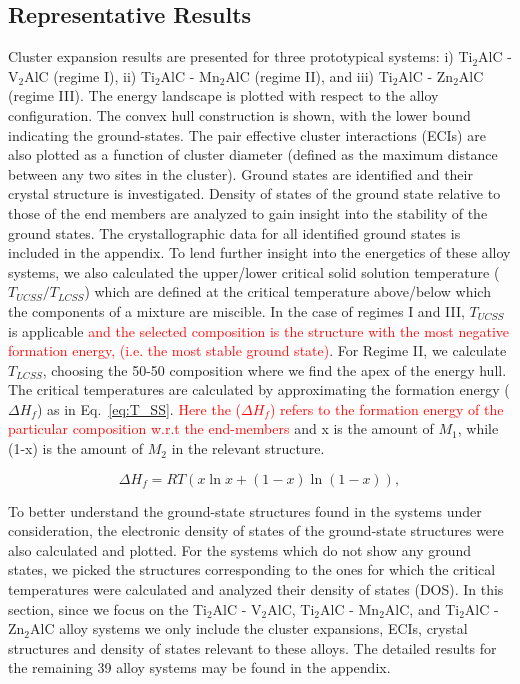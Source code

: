\documentclass[preprint,amsmath,amssymb,aps, prb,showkeys]{revtex4-1}
\newcommand{\eq}[1]{Eq.~\ref{#1}}
\begin{document}
\subsection{Representative Results}
 Cluster expansion results are presented for three prototypical systems: i) Ti$_2$AlC - V$_2$AlC  (regime I), ii) Ti$_2$AlC - Mn$_2$AlC  (regime II), and iii) Ti$_2$AlC - Zn$_2$AlC  (regime III). The energy landscape is plotted with respect to the alloy configuration. The convex hull construction is shown, with the lower bound indicating the ground-states. The pair effective cluster interactions (ECIs) are also plotted as a function of cluster diameter (defined as the maximum distance between any two sites in the cluster). Ground states are identified and their crystal structure  is investigated. Density of states of the ground state relative to those of the end members are analyzed to gain insight into the stability of the ground states. The crystallographic data for all identified ground states is included in the appendix. To lend further insight into the energetics of these alloy systems, we also calculated the upper/lower critical solid solution temperature ($T_{UCSS}/T_{LCSS}$) which are defined at the critical temperature above/below which the components of a mixture are 
miscible. In the case of regimes I and III, $T_{UCSS}$ is applicable \textcolor{red}{and the selected composition is the structure with the most negative formation energy, (i.e. the most stable ground state)}. For Regime II, we calculate $T_{LCSS}$, choosing the 50-50 composition where we find the apex of the energy hull. The critical temperatures are calculated by approximating the formation energy  ($\Delta H_f$) as in \eq{eq:T_SS}. \textcolor{red}{Here the ($\Delta H_f$) refers to the formation energy of the particular composition w.r.t the end-members} and x is the amount of $M_1$, while (1-x) is the amount of $M_2$ in the relevant structure.

\begin{equation}
  \Delta H_f = RT(x\ln x + (1-x)\ln(1-x)) , 
  \label{eq:T_SS}
\end{equation}

To better understand the ground-state structures found in the systems under consideration, the electronic density of
states of the ground-state structures were also calculated and plotted. For the systems which do not show any ground states, we picked the structures corresponding to the ones for which the critical temperatures were calculated and analyzed their density of states (DOS).
In this section, since we focus on the Ti$_2$AlC - V$_2$AlC,  Ti$_2$AlC - Mn$_2$AlC, and  Ti$_2$AlC - Zn$_2$AlC alloy systems we only include the cluster expansions, ECIs, crystal structures and density of states relevant to these alloys. The detailed results for the remaining 39 alloy systems may be found in the appendix. 
\end{document}
